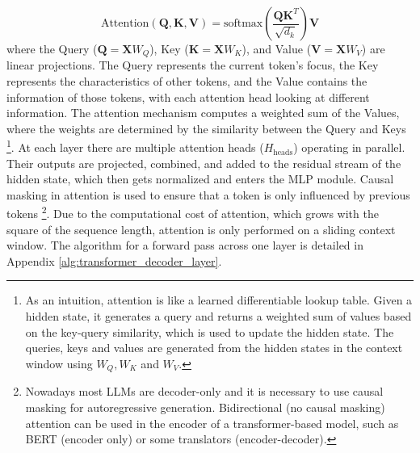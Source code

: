 \documentclass[a4paper,12pt]{article}
\begin{document}
    \begin{equation}
        \text{Attention}(\mathbf{Q}, \mathbf{K}, \mathbf{V}) = \text{softmax}\left(\frac{\mathbf{Q}\mathbf{K}^T}{\sqrt{d_k}}\right)\mathbf{V}
    \end{equation}
    where the Query ($\mathbf{Q} = \mathbf{X} W_Q$), Key ($\mathbf{K} = \mathbf{X} W_K$), and Value ($\mathbf{V} = \mathbf{X} W_V$) are linear projections. The Query represents the current token's focus, the Key represents the characteristics of other tokens, and the Value contains the information of those tokens, with each attention head looking at different information. The attention mechanism computes a weighted sum of the Values, where the weights are determined by the similarity between the Query and Keys \footnote{As an intuition, attention is like a learned differentiable lookup table. Given a hidden state, it generates a query and returns a weighted sum of values based on the key-query similarity, which is used to update the hidden state. The queries, keys and values are generated from the hidden states in the context window using $W_Q, W_K$ and $W_V$.}. At each layer there are multiple attention heads ($H_{\text{heads}}$) operating in parallel. Their outputs are projected, combined, and added to the residual stream of the hidden state, which then gets normalized and enters the MLP module. 
    Causal masking in attention is used to ensure that a token is only influenced by previous tokens
    \footnote{Nowadays most LLMs are decoder-only and it is necessary to use causal masking for autoregressive generation. Bidirectional (no causal masking) attention can be used in the encoder of a transformer-based model, such as BERT (encoder only) or some translators (encoder-decoder).}.
    Due to the computational cost of attention, which grows with the square of the sequence length, attention is only performed on a sliding context window. The algorithm for a forward pass across one layer is detailed in Appendix \ref{alg:transformer_decoder_layer}.

\end{document}
